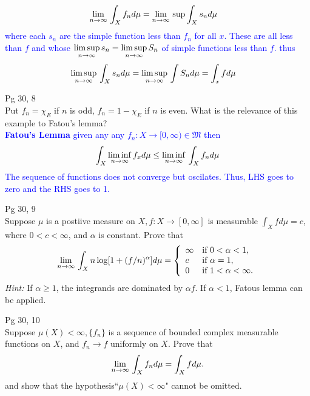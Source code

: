 \documentclass[10pt,a4paper]{report}
\newcommand{\BLUE}[1]{\textcolor{blue}{#1}}
\begin{document}
\BLUE{\begin{align*}
	\underset{n \to \infty}\lim\, \int_X f_n d\mu &= \underset{n \to \infty}\lim\, \sup \int_X s_n d\mu
\end{align*}where each $s_n$ are the simple function less than $f_n$ for all $x$.  These are all less than $f$ and whose $\underset{n\to\infty}\limsup \, s_n = \underset{n\to\infty}\limsup \, S_n$ of simple functions less than $f$.   thus
\begin{align*}
	\underset{n\to\infty}\limsup \, \int_X s_n d\mu &= \underset{n\to\infty}\limsup \, \int S_n d\mu = \int_x f d\mu
\end{align*}
}

\HLINE
\noindent Pg 30, 8\\

Put $f_n= \chi_E$ if $n$ is odd, $f_n=1-\chi_E$ if $n$ is even.  What is the relevance of this example to Fatou's lemma?\\

\BLUE{\textbf{Fatou's Lemma} given any any $f_n : X \to [0, \infty) \in \mathfrak{M}$ then 
\begin{align*}
	\int_X \underset{n\to\infty}\liminf \, f_x d\mu \le \underset{n\to\infty}\liminf \, \int_X f_n d\mu 
\end{align*}The sequence of functions does not converge but oscilates.  Thus, LHS goes to zero and the RHS goes to 1.
}


\HLINE
\noindent Pg 30, 9\\

Suppose $\mu$ is a postiive measure on $X,f:X\to [0,\infty]$ is measurable $\int_X f d\mu=c$, where $0 < c<\infty$, and $\alpha$ is constant.  Prove that 
\begin{align*}
	\underset{n \to \infty}\lim\, \int_X n \log [1+(f/n)^\alpha] d\mu = \left \{ \begin{array}{ll}
		\infty	& \text{if } 0<\alpha<1,\\
		c & \text{if }\alpha = 1, \\	
		0 & \text{if } 1 < \alpha < \infty.
	\end{array}  \right .
\end{align*} \textit{Hint:} If $\alpha \ge 1$, the integrands are dominated by $\alpha f$.  If $\alpha < 1$, Fatous lemma can be applied.


\HLINE
\noindent Pg 30, 10\\

Suppose $\mu(X) < \infty, \{f_n\}$ is a sequence of bounded complex measurable functions on $X$, and $f_n \to f$ uniformly on $X$.  Prove that
\begin{align*}
	\underset{n \to \infty}\lim\, \int_X f_n d \mu = \int_X f d \mu.
\end{align*}and show that the hypothesis``$\mu(X) < \infty$" cannot be omitted.
\end{document}

